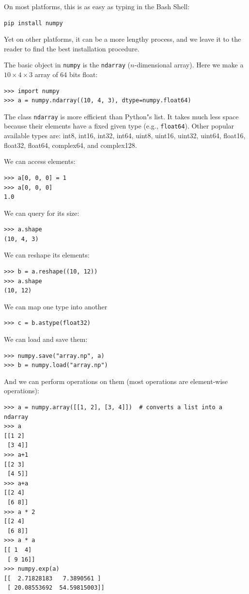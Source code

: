\documentclass[justified, sixbynine]{tufte-book}
\def\ft{\small\tt}
\theoremstyle{plain}%
\newtheorem * {corollary}{Corollary}
\theoremstyle{definition}
\theoremstyle{remark}
\newtheorem * {remark}{Remark}
\newtheorem * {note}{Note}
\begin{document}
\begin{fullwidth}
On most platforms, this is as easy as typing in the Bash Shell:
\begin{lstlisting}
pip install numpy
\end{lstlisting}
Yet on other platforms, it can be a more lengthy process, and we leave it to the reader to find the best installation procedure.

The basic object in {\ft numpy} is the {\ft ndarray} ($n$-dimensional array). Here we make a $10\times 4\times 3$ array of 64 bits float:

\begin{lstlisting}
>>> import numpy
>>> a = numpy.ndarray((10, 4, 3), dtype=numpy.float64)
\end{lstlisting}

The class {\ft ndarray} is more efficient than Python"s list. It takes much less space because their elements have a fixed given type (e.g., {\ft float64}). Other popular available types are: int8, int16, int32, int64, uint8, uint16, uint32, uint64, float16, float32, float64, complex64, and complex128.

We can access elements:

\begin{lstlisting}
>>> a[0, 0, 0] = 1
>>> a[0, 0, 0]
1.0
\end{lstlisting}

We can query for its size:

\begin{lstlisting}
>>> a.shape
(10, 4, 3)
\end{lstlisting}

We can reshape its elements:

\begin{lstlisting}
>>> b = a.reshape((10, 12))
>>> a.shape
(10, 12)
\end{lstlisting}

We can map one type into another
\begin{lstlisting}
>>> c = b.astype(float32)
\end{lstlisting}

We can load and save them:

\begin{lstlisting}
>>> numpy.save("array.np", a)
>>> b = numpy.load("array.np")
\end{lstlisting}

And we can perform operations on them (most operations are element-wise operations):

\begin{lstlisting}
>>> a = numpy.array([[1, 2], [3, 4]])  # converts a list into a ndarray
>>> a
[[1 2]
 [3 4]]
>>> a+1
[[2 3]
 [4 5]]
>>> a+a
[[2 4]
 [6 8]]
>>> a * 2
[[2 4]
 [6 8]]
>>> a * a
[[ 1  4]
 [ 9 16]]
>>> numpy.exp(a)
[[  2.71828183   7.3890561 ]
 [ 20.08553692  54.59815003]]
\end{lstlisting}


\end{fullwidth}
\end{document}
